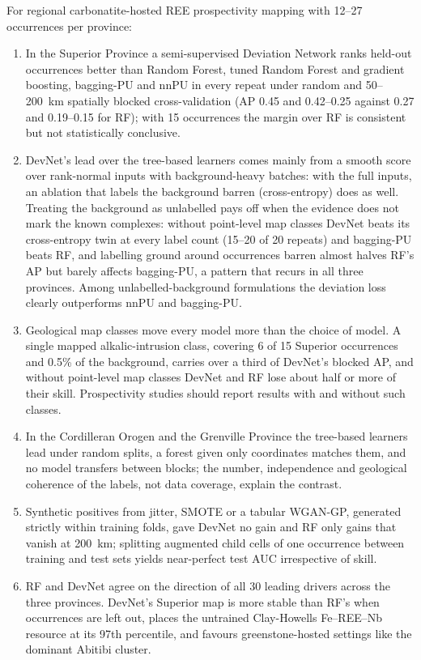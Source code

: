 \documentclass[pdflatex,sn-apa]{sn-jnl}
\begin{document}
For regional carbonatite-hosted REE prospectivity mapping with 12--27 occurrences per province:
\begin{enumerate}
\item In the Superior Province a semi-supervised Deviation Network ranks held-out occurrences better than Random Forest, tuned Random Forest and gradient boosting, bagging-PU and nnPU in every repeat under random and 50--200~km spatially blocked cross-validation (AP 0.45 and 0.42--0.25 against 0.27 and 0.19--0.15 for RF); with 15 occurrences the margin over RF is consistent but not statistically conclusive.
\item DevNet's lead over the tree-based learners comes mainly from a smooth score over rank-normal inputs with background-heavy batches: with the full inputs, an ablation that labels the background barren (cross-entropy) does as well. Treating the background as unlabelled pays off when the evidence does not mark the known complexes: without point-level map classes DevNet beats its cross-entropy twin at every label count (15--20 of 20 repeats) and bagging-PU beats RF, and labelling ground around occurrences barren almost halves RF's AP but barely affects bagging-PU, a pattern that recurs in all three provinces. Among unlabelled-background formulations the deviation loss clearly outperforms nnPU and bagging-PU.
\item Geological map classes move every model more than the choice of model. A single mapped alkalic-intrusion class, covering 6 of 15 Superior occurrences and 0.5\% of the background, carries over a third of DevNet's blocked AP, and without point-level map classes DevNet and RF lose about half or more of their skill. Prospectivity studies should report results with and without such classes.
\item In the Cordilleran Orogen and the Grenville Province the tree-based learners lead under random splits, a forest given only coordinates matches them, and no model transfers between blocks; the number, independence and geological coherence of the labels, not data coverage, explain the contrast.
\item Synthetic positives from jitter, SMOTE or a tabular WGAN-GP, generated strictly within training folds, gave DevNet no gain and RF only gains that vanish at 200~km; splitting augmented child cells of one occurrence between training and test sets yields near-perfect test AUC irrespective of skill.
\item RF and DevNet agree on the direction of all 30 leading drivers across the three provinces. DevNet's Superior map is more stable than RF's when occurrences are left out, places the untrained Clay-Howells Fe--REE--Nb resource at its 97th percentile, and favours greenstone-hosted settings like the dominant Abitibi cluster.
\end{enumerate}
\end{document}
